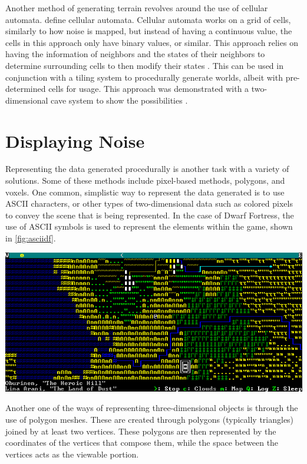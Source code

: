 \documentclass[10pt]{report}
\begin{document}
		Another method of generating terrain revolves around the use of cellular automata. define cellular automata. Cellular automata works on a grid of cells, similarly to how noise is mapped, but instead of having a continuous value, the cells in this approach only have binary values, or similar. This approach relies on having the information of neighbors and the states of their neighbors to determine surrounding cells to then modify their states \cite{nature-of-code}. This can be used in conjunction with a tiling system to procedurally generate worlds, albeit with pre-determined cells for usage. This approach was demonstrated with a two-dimensional cave system to show the possibilities \cite{10.1145/1814256.1814266}.
		
		\section{Displaying Noise}
	
		Representing the data generated procedurally is another task with a variety of solutions. Some of these methods include pixel-based methods, polygons, and voxels. One common, simplistic way to represent the data generated is to use ASCII characters, or other types of two-dimensional data such as colored pixels to convey the scene that is being represented. In the case of Dwarf Fortress, the use of ASCII symbols is used to represent the elements within the game, shown in \autoref{fig:asciidf}.
		
		\begin{minipage}{\textwidth}
			\centering
			\includegraphics[scale=.5]{dwarf_fortress}
			\label{fig:asciidf}
		\end{minipage}
		
		Another one of the ways of representing three-dimensional objects is through the use of polygon meshes. These are created through polygons (typically triangles) joined by at least two vertices. These polygons are then represented by the coordinates of the vertices that compose them, while the space between the vertices acts as the viewable portion.
		
\end{document}
